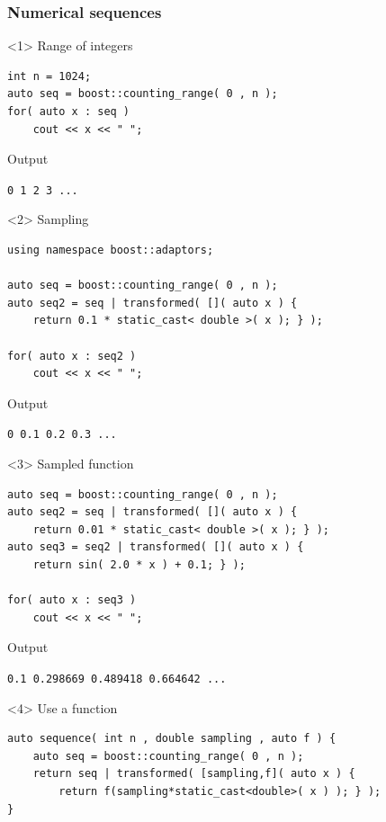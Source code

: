 \documentclass{beamer}
\newcommand{\heading}[1]{\frametitle{#1}}
\begin{document}
\begin{frame}[fragile]
 \heading{Numerical sequences}
 
 \begin{onlyenv}<1>
Range of integers
\begin{lstlisting}[basicstyle=\scriptsize\ttfamily]
int n = 1024;
auto seq = boost::counting_range( 0 , n );
for( auto x : seq )
    cout << x << " ";
\end{lstlisting}
\vspace{2ex}Output

\vspace{0.5ex}\lstinline$0 1 2 3 ...$
 \end{onlyenv}
  \begin{onlyenv}<2>
Sampling
\begin{lstlisting}[basicstyle=\scriptsize\ttfamily]
using namespace boost::adaptors;

auto seq = boost::counting_range( 0 , n );
auto seq2 = seq | transformed( []( auto x ) {
    return 0.1 * static_cast< double >( x ); } );

for( auto x : seq2 )
    cout << x << " ";
\end{lstlisting}
\vspace{2ex}Output

\vspace{0.5ex}\lstinline$0 0.1 0.2 0.3 ...$
 \end{onlyenv}
  \begin{onlyenv}<3>
Sampled function
\begin{lstlisting}[basicstyle=\scriptsize\ttfamily]
auto seq = boost::counting_range( 0 , n );
auto seq2 = seq | transformed( []( auto x ) {
    return 0.01 * static_cast< double >( x ); } );
auto seq3 = seq2 | transformed( []( auto x ) {
    return sin( 2.0 * x ) + 0.1; } );

for( auto x : seq3 )
    cout << x << " ";
\end{lstlisting}
\vspace{2ex}Output

\vspace{0.5ex}\lstinline$0.1 0.298669 0.489418 0.664642 ...$
 \end{onlyenv}
  \begin{onlyenv}<4>
Use a function
\begin{lstlisting}[basicstyle=\scriptsize\ttfamily]
auto sequence( int n , double sampling , auto f ) {
    auto seq = boost::counting_range( 0 , n );
    return seq | transformed( [sampling,f]( auto x ) { 
        return f(sampling*static_cast<double>( x ) ); } );
}


\end{lstlisting}
\end{onlyenv}
\end{frame}
\end{document}
